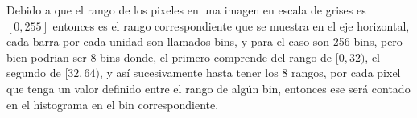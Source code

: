 \documentclass[twoside,spanish,ESP,MSc]{plantillaLabUPV}
\theoremstyle{definition}
\begin{document}
Debido a que el rango de los pixeles en una imagen en escala de grises es $[0,255]$ entonces es el rango correspondiente que se muestra en el eje horizontal, cada barra por cada unidad son llamados bins, y para el caso son 256 bins, pero bien podrian ser 8 bins donde, el primero comprende del rango de $[0,32)$, el segundo de $[32,64)$, y así sucesivamente hasta tener los 8 rangos, por cada pixel que tenga un valor definido entre el rango de algún bin, entonces ese será contado en el histograma en el bin correspondiente.  
%
%
%
%
%
%
\end{document}
